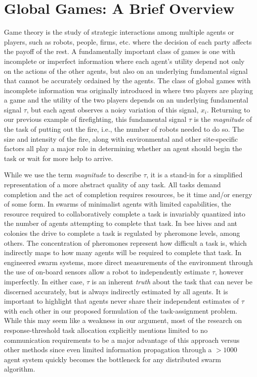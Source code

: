 \documentclass[conference]{ieeeconf}
\begin{document}
\section{Global Games: A Brief Overview}\label{sec:ggoverview}
Game theory is the study of strategic interactions among multiple agents or players, such as robots, people, firms, etc. where the decision of each party affects the payoff of the rest. A fundamentally important class of games is one with incomplete or imperfect information where each agent's utility depend not only on the actions of the other agents, but also on an underlying fundamental signal that cannot be accurately ordained by the agents. The class of global games with incomplete information was originally introduced in \cite{Carlsson1993} where two players are playing a game and the utility of the two players depends on an underlying fundamental signal $\tau$, but each agent observes a noisy variation of this signal, $x_i$. Returning to our previous example of firefighting, this fundamental signal $\tau$ is the \emph{magnitude} of the task of putting out the fire, i.e., the number of robots needed to do so. The size and intensity of the fire, along with environmental and other site-specific factors all play a major role in determining whether an agent should begin the task or wait for more help to arrive.

While we use the term \emph{magnitude} to describe $\tau$, it is a stand-in for a simplified representation of a more abstract quality of any task. All tasks demand completion and the act of completion requires resources, be it time and/or energy of some form. In swarms of minimalist agents with limited capabilities, the resource required to collaboratively complete a task is invariably quantized into the number of agents attempting to complete that task. In bee hives and ant colonies the drive to complete a task is regulated by pheromone levels, among others. The concentration of pheromones represent how difficult a task is, which indirectly maps to how many agents will be required to complete that task. In engineered swarm systems, more direct measurements of the environment through the use of on-board sensors allow a robot to independently estimate $\tau$, however imperfectly. In either case, $\tau$ is an inherent \emph{truth} about the task that can never be discerned accurately, but is always indirectly estimated by all agents. It is important to highlight that agents never share their independent estimates of $\tau$ with each other in our proposed formulation of the task-assignment problem. While this may seem like a weakness in our argument, most of the research on response-threshold task allocation explicitly mentions limited to no communication requirements to be a major advantage of this approach versus other methods since even limited information propagation through a $>1000$ agent system quickly becomes the bottleneck for any distributed swarm algorithm.
\end{document}

